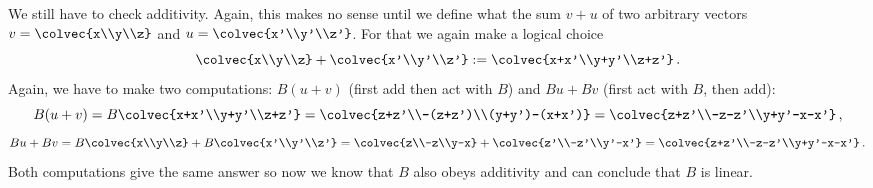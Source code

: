 \begin{example}
We still have to check additivity. Again, this makes no sense until we define what the sum $v+u$ of two arbitrary vectors $v=\colvec{x\\y\\z}$ 
and $u=\colvec{x'\\y'\\z'}$. For that we again make a logical choice
\[
\colvec{x\\y\\z}+\colvec{x'\\y'\\z'}:=\colvec{x+x'\\y+y'\\z+z'}\, .
\]
Again, we have to make two computations: $B(u+v)$ (first add then act with $B$) and $Bu+Bv$ (first act with $B$, then add):
\[
B(u+v)=B\colvec{x+x'\\y+y'\\z+z'}=\colvec{z+z'\\-(z+z')\\(y+y')-(x+x')}=\colvec{z+z'\\-z-z'\\y+y'-x-x'}\, ,
\]
\[
Bu+Bv=B\colvec{x\\y\\z}+B\colvec{x'\\y'\\z'}=\colvec{z\\-z\\y-x}+\colvec{z'\\-z'\\y'-x'}=\colvec{z+z'\\-z-z'\\y+y'-x-x'}\, .
\]
Both computations give the same answer so now we know that $B$ also obeys additivity and can conclude that $B$ is linear.

\end{example}
